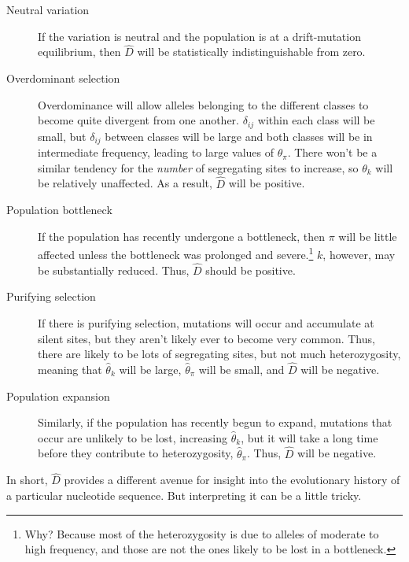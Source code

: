\documentclass[12pt]{article}
\begin{document}
\begin{description}

\item[Neutral variation] If the variation is neutral and the
  population is at a drift-mutation equilibrium, then $\hat D$ will be
  statistically indistinguishable from zero.

\item[Overdominant selection] Overdominance will allow alleles
  belonging to the different classes to become quite divergent from one
  another. $\delta_{ij}$ within each class will be small, but
  $\delta_{ij}$ between classes will be large and both classes will be
  in intermediate frequency, leading to large values of
  $\theta_\pi$. There won't be a similar tendency for the {\it
  number\/} of segregating sites to increase, so $\theta_k$ will be
  relatively unaffected. As a result, $\hat D$ will be positive.

\item[Population bottleneck] If the population has recently undergone
  a bottleneck, then $\pi$ will be little affected unless the
  bottleneck was prolonged and severe.\footnote{Why? Because most of
    the heterozygosity is due to alleles of moderate to high
    frequency, and those are not the ones likely to be lost in a
    bottleneck.}  $k$, however, may be substantially reduced. Thus,
  $\hat D$ should be positive.

\item[Purifying selection] If there is purifying selection, mutations
  will occur and accumulate at silent sites, but they aren't likely
  ever to become very common. Thus, there are likely to be lots of
  segregating sites, but not much heterozygosity, meaning that
  $\hat\theta_k$ will be large, $\hat\theta_\pi$ will be small, and
  $\hat D$ will be negative.

\item[Population expansion] Similarly, if the population has recently
  begun to expand, mutations that occur are unlikely to be lost,
  increasing $\hat\theta_k$, but it will take a long time before they
  contribute to heterozygosity, $\hat\theta_\pi$. Thus, $\hat D$ will
  be negative.

\end{description}

In short, $\hat D$ provides a different avenue for insight into the
evolutionary history of a particular nucleotide sequence. But
interpreting it can be a little tricky.
\end{document}
